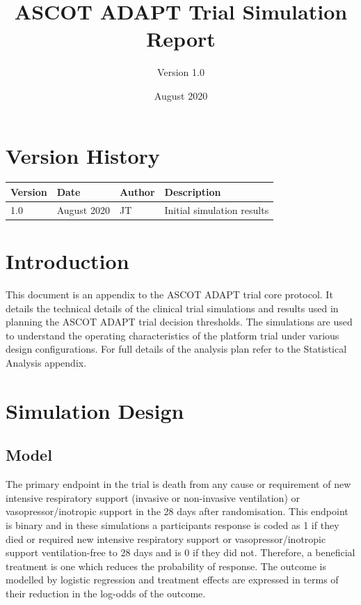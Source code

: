 \documentclass[
]{article}
\title{ASCOT ADAPT Trial Simulation Report}
\subtitle{Version 1.0}
\author{}
\date{\vspace{-2.5em}August 2020}
\begin{document}
\maketitle

{
\setcounter{tocdepth}{2}
\tableofcontents
}
\hypertarget{version-history}{%
\section*{Version History}\label{version-history}}

\begin{center}
    \begin{tabular}{lllp{5cm}}
    \hline
    Version & Date & Author & Description \\ \hline
    1.0 & August 2020 & JT & Initial simulation results \\ 
    \hline
    \end{tabular}
\end{center}

\clearpage

\hypertarget{introduction}{%
\section{Introduction}\label{introduction}}

This document is an appendix to the ASCOT ADAPT trial core protocol.
It details the technical details of the clinical trial simulations and results used in planning the ASCOT ADAPT trial decision thresholds.
The simulations are used to understand the operating characteristics of the platform trial under various design configurations.
For full details of the analysis plan refer to the Statistical Analysis appendix.

\clearpage

\hypertarget{simulation-design}{%
\section{Simulation Design}\label{simulation-design}}

\hypertarget{model}{%
\subsection{Model}\label{model}}

The primary endpoint in the trial is death from any cause or requirement of new intensive respiratory support (invasive or non-invasive ventilation) or vasopressor/inotropic support in the 28 days after randomisation.
This endpoint is binary and in these simulations a participants response is coded as 1 if they died or required new intensive respiratory support or vasopressor/inotropic support ventilation-free to 28 days and is 0 if they did not.
Therefore, a beneficial treatment is one which reduces the probability of response.
The outcome is modelled by logistic regression and treatment effects are expressed in terms of their reduction in the log-odds of the outcome.
\end{document}
